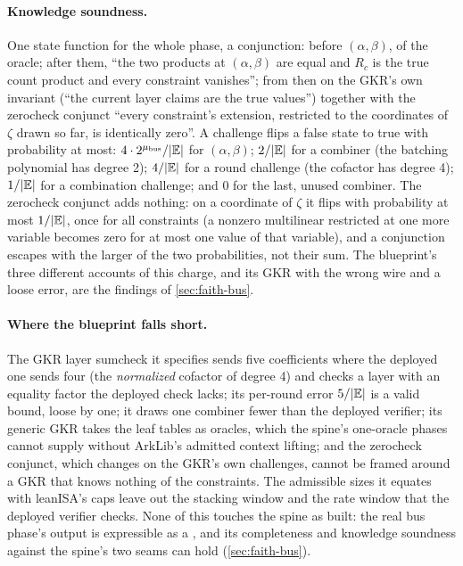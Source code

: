 \paragraph{Knowledge soundness.} One state function for the whole phase, a conjunction:
before $(\alpha, \beta)$,  of the oracle; after them, \enquote{the two products at
$(\alpha, \beta)$ are equal and $R_c$ is the true count product and every constraint vanishes};
from then on the GKR's own invariant (\enquote{the current layer claims are the true values})
together with the zerocheck conjunct \enquote{every constraint's extension, restricted to the
coordinates of $\zeta$ drawn so far, is identically zero}. A challenge flips a false state
to true with probability at most: $4 \cdot 2^{\mu_{\mathrm{bus}}} / \lvert \mathbb{E}\rvert$ for
$(\alpha, \beta)$; $2 / \lvert \mathbb{E}\rvert$ for a combiner (the batching polynomial has degree 2);
$4 / \lvert \mathbb{E}\rvert$ for a round challenge (the cofactor has degree 4); $1 / \lvert \mathbb{E}\rvert$ for a
combination challenge; and $0$ for the last, unused combiner. The zerocheck conjunct adds
nothing: on a coordinate of $\zeta$ it flips with probability at most $1 / \lvert \mathbb{E}\rvert$, once for
all constraints (a nonzero multilinear restricted at one more variable becomes zero for at most
one value of that variable), and a conjunction escapes with the larger of the two
probabilities, not their sum. The blueprint's three different accounts of this charge, and its
GKR with the wrong wire and a loose error, are the findings of \cref{sec:faith-bus}.

\paragraph{Where the blueprint falls short.} The GKR layer sumcheck it specifies sends five
coefficients where the deployed one sends four (the \emph{normalized} cofactor of degree 4)
and checks a layer with an equality factor the deployed check lacks; its per-round error
$5/\lvert \mathbb{E}\rvert$ is a valid bound, loose by one; it draws one combiner fewer than the deployed verifier; its generic GKR takes the
leaf tables as oracles, which the spine's one-oracle phases cannot supply without ArkLib's
admitted context lifting; and the zerocheck conjunct, which changes on the GKR's own
challenges, cannot be framed around a GKR that knows nothing of the constraints. The admissible
sizes it equates with leanISA's caps leave out the stacking window and the rate window that the
deployed verifier checks. None of this touches the spine as built: the real bus phase's output
is expressible as a , and its completeness and knowledge soundness against the
spine's two seams can hold (\cref{sec:faith-bus}).

